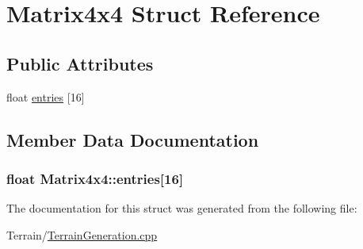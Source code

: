 \hypertarget{struct_matrix4x4}{}\section{Matrix4x4 Struct Reference}
\label{struct_matrix4x4}
\subsection*{Public Attributes}
\begin{DoxyCompactItemize}
\item 
float \hyperlink{struct_matrix4x4_a13aceeab368d04395f206b8ff888ceb1}{entries} \mbox{[}16\mbox{]}
\end{DoxyCompactItemize}


\subsection{Member Data Documentation}
\hypertarget{struct_matrix4x4_a13aceeab368d04395f206b8ff888ceb1}{}
\subsubsection[{entries}]{\setlength{\rightskip}{0pt plus 5cm}float Matrix4x4\+::entries\mbox{[}16\mbox{]}}\label{struct_matrix4x4_a13aceeab368d04395f206b8ff888ceb1}


The documentation for this struct was generated from the following file\+:\begin{DoxyCompactItemize}
\item 
Terrain/\hyperlink{_terrain_generation_8cpp}{Terrain\+Generation.\+cpp}\end{DoxyCompactItemize}
